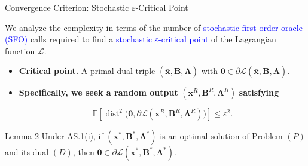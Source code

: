 \documentclass[mathserif,compress,override,9pt]{beamer}
\numberwithin{equation}{section}
\newcommand{\EE}{\mathbb{E}}
\newcommand{\bx}{\bm{x}}
\newcommand{\bB}{\bm{B}}
\newcommand{\bLmbd}{\bm{\Lambda}}
\newcommand{\calL}{\mathcal{L}}
\newcommand\argmin{\mathop{\mathrm{argmin}}}
\newcommand{\blue}[1]{\textcolor{blue}{#1}}
\theoremstyle{remark}
\begin{document}
\begin{frame}[t]{Convergence Criterion: Stochastic $\varepsilon$-Critical Point}
\vspace{0.1cm}

We analyze the complexity in terms of the number of
\blue{stochastic first-order oracle (SFO)} calls required to find a
\blue{stochastic $\varepsilon$-critical point}
of the Lagrangian function $\calL$.

\vspace{0.1cm}
\begin{itemize}
  \item \textbf{Critical point.} A primal-dual triple $(\bar{\bx},\bar{\bB},\bar{\bLmbd})$
  with $\bm{0}\in\partial\calL(\bar{\bx},\bar{\bB},\bar{\bLmbd})$.
  \item \textbf{Specifically, we seek a random output}
  $(\bx^R,\bB^R,\bLmbd^R)$ \textbf{satisfying}

\[
\EE\!\left[
\operatorname{dist}^2
\bigl(\bm{0},\partial\calL(\bx^R,\bB^R,\bLmbd^R)\bigr)
\right]
\le \varepsilon^2.
\]

\end{itemize}


\vspace{0.04cm}
\begin{block}{Lemma 2}
Under AS.1(i), if
$(\bx^*,\bB^*,\bLmbd^*)$ is an optimal solution of Problem $(P)$
and its dual $(D)$, then
$\bm{0}\in \partial\calL(\bx^*,\bB^*,\bLmbd^*).$
\end{block}
\end{frame}


\end{document}
